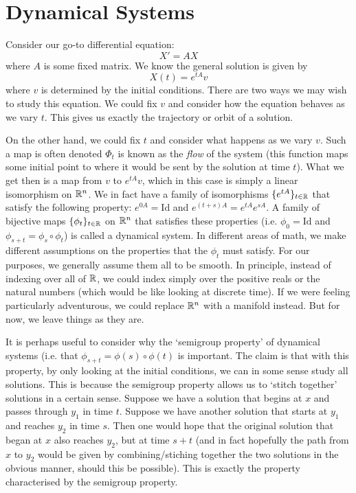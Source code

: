 \section{Dynamical Systems}\label{sec:dyn-systems}
Consider our go-to differential equation:
$$ X' = AX $$
where $A$ is some fixed matrix. We know the general solution is given by $$ X(t) = e^{tA}v $$ where $v$ is determined by the initial conditions. There are two ways we may wish to study this equation. We could fix $v$ and consider how the equation behaves as we vary $t$. This gives us exactly the trajectory or orbit of a solution.

On the other hand, we could fix $t$ and consider what happens as we vary $v$. Such a map is often denoted $\Phi_t$ is known as the \textit{flow} of the system (this function maps some initial point to where it would be sent by the solution at time $t$). What we get then is a map from $v$ to $e^{tA}v$, which in this case is simply a linear isomorphism on $\mathbb{R}^n$. We in fact have a family of isomorphisms $\{e^{tA}\}_{t \in \mathbb{R}}$ that satisfy the following property: $e^{0A} = \text{Id}$ and $e^{(t + s)A} = e^{tA} e^{sA}$. A family of bijective maps $\{\phi_t\}_{t \in \mathbb{R}}$ on $\mathbb{R}^n$ that satisfies these properties (i.e. $\phi_0 = \text{Id}$ and $\phi_{s + t} = \phi_s \circ \phi_t$) is called a dynamical system. In different areas of math, we make different assumptions on the properties that the $\phi_t$ must satisfy. For our purposes, we generally assume them all to be smooth. In principle, instead of indexing over all of $\mathbb{R}$, we could index simply over the positive reals or the natural numbers (which would be like looking at discrete time). If we were feeling particularly adventurous, we could replace $\mathbb{R}^n$ with a manifold instead. But for now, we leave things as they are.

It is perhaps useful to consider why the `semigroup property' of dynamical systems (i.e. that $\phi_{s + t} = \phi(s) \circ \phi(t)$ is important. The claim is that with this property, by only looking at the initial conditions, we can in some sense study all solutions. This is because the semigroup property allows us to `stitch together' solutions in a certain sense. Suppose we have a solution that begins at $x$ and passes through $y_1$ in time $t$. Suppose we have another solution that starts at $y_1$ and reaches $y_2$ in time $s$. Then one would hope that the original solution that began at $x$ also reaches $y_2$, but at time $s + t$ (and in fact hopefully the path from $x$ to $y_2$ would be given by combining/stiching together the two solutions in the obvious manner, should this be possible). This is exactly the property characterised by the semigroup property.

